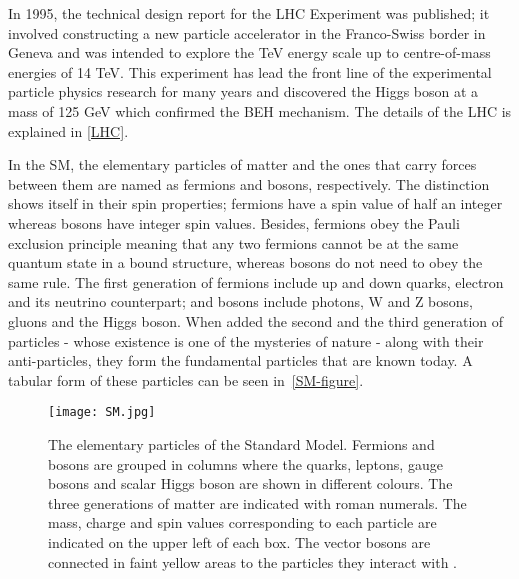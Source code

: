 In 1995, the technical design report for the LHC Experiment was published\cite{lhc-tdr}; it involved constructing a new particle accelerator in the Franco-Swiss border in Geneva and was intended to explore the TeV energy scale up to centre-of-mass energies of 14 TeV. This experiment has lead the front line of the experimental particle physics research for many years and discovered the Higgs boson at a mass of 125 GeV which confirmed the BEH mechanism. The details of the LHC is explained in \autoref{LHC}.

In the SM, the elementary particles of matter and the ones that carry forces between them are named as fermions and bosons, respectively. The distinction shows itself in their spin properties; fermions have a spin value of half an integer whereas bosons have integer spin values. Besides, fermions obey the Pauli exclusion principle meaning that any two fermions cannot be at the same quantum state in a bound structure, whereas bosons do not need to obey the same rule. The first generation of fermions include up and down quarks, electron and its neutrino counterpart; and bosons include photons, W and Z bosons, gluons and the Higgs boson. When added the second and the third generation of particles - whose existence is one of the mysteries of nature - along with their anti-particles, they form the fundamental particles that are known today. A tabular form of these particles can be seen in~\autoref{SM-figure}.

\vspace{6pt}
\begin{figure}[ht]
	\centering
	\texttt{[image: SM.jpg]}
	\vspace{-0.5cm}
	\vspace{6pt}
	\caption[The elementary particles of the Standard Model. Fermions and bosons are grouped in columns where the quarks, leptons, gauge bosons and scalar Higgs boson are shown in different colours. The three generations of matter are indicated with roman numerals. The mass, charge and spin values corresponding to each particle are indicated on the upper left of each box. The vector bosons are connected in faint yellow areas to the particles they interact with.]{The elementary particles of the Standard Model. Fermions and bosons are grouped in columns where the quarks, leptons, gauge bosons and scalar Higgs boson are shown in different colours. The three generations of matter are indicated with roman numerals. The mass, charge and spin values corresponding to each particle are indicated on the upper left of each box. The vector bosons are connected in faint yellow areas to the particles they interact with \cite{SM-ref}.}
	\label{SM-figure}
\end{figure}

